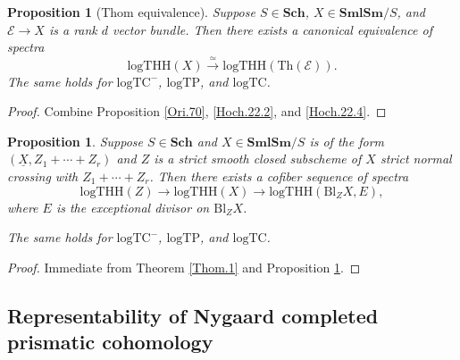 \documentclass[11pt, a4paper]{amsart}
\newtheorem{prop}[thm]{Proposition}
\theoremstyle{definition}
\numberwithin{equation}{subsection}
\newcommand{\Sch}{\mathbf{Sch}}
\newcommand{\SmlSm}{\mathbf{SmlSm}}
\newcommand{\Blow}{{\mathrm{Bl}}}
\newcommand{\Thom}{\mathrm{Th}}
\renewcommand{\ul}{\underline}
\newcommand{\logTHH}{\mathrm{logTHH}}
\newcommand{\logTC}{\mathrm{logTC}}
\newcommand{\logTP}{\mathrm{logTP}}
\newcommand{\cE}{\mathcal{E}}
\begin{document}
\begin{prop}[Thom equivalence]
\label{trace.10}
Suppose $S\in \Sch$, $X\in \SmlSm/S$, and $\cE\to X$ is a rank $d$ vector bundle.
Then there exists a canonical equivalence of spectra
\[
\logTHH(X)
\xrightarrow{\simeq}
\logTHH(\Thom(\cE)).
\]
The same holds for $\logTC^-$, $\logTP$, and $\logTC$.
\end{prop}
\begin{proof}
Combine Proposition \ref{Ori.70}, \eqref{Hoch.22.2}, and \eqref{Hoch.22.4}.
\end{proof}


\begin{prop}
\label{trace.11}
Suppose $S\in \Sch$ and $X\in\SmlSm/S$ is of the form $(\ul{X},Z_1+\cdots+Z_r)$ and $Z$ is a strict smooth closed subscheme of $X$ strict normal crossing with $Z_1+\cdots+Z_r$.
Then there exists a cofiber sequence of spectra
\[
\logTHH(Z)
\to
\logTHH(X)
\to
\logTHH(\Blow_Z X,E),
\]
where $E$ is the exceptional divisor on $\Blow_Z X$.

The same holds for $\logTC^-$, $\logTP$, and $\logTC$.
\end{prop}
\begin{proof}
Immediate from Theorem \ref{Thom.1} and Proposition \ref{trace.10}.
\end{proof}




\subsection{Representability of Nygaard completed prismatic cohomology}
\label{subsection:rncpc}
\end{document}
